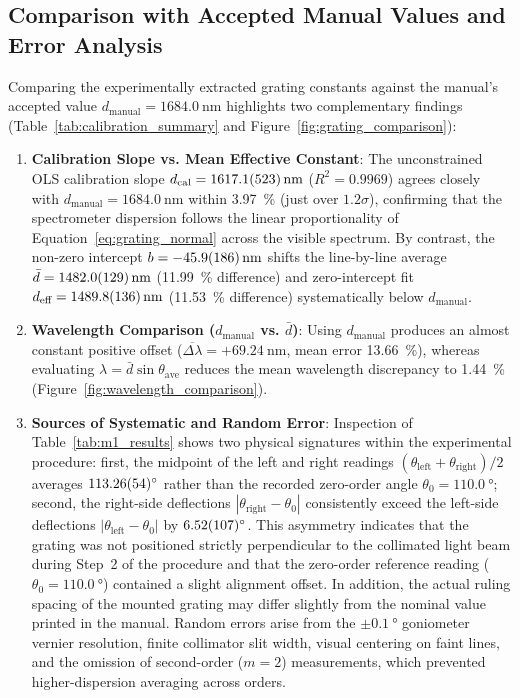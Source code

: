 \documentclass[journal]{IEEEtran}
\begin{document}
\subsection{Comparison with Accepted Manual Values and Error Analysis}
Comparing the experimentally extracted grating constants against the manual's accepted value $d_{\text{manual}} = \SI{1684.0}{\nano\meter}$ highlights two complementary findings (Table~\ref{tab:calibration_summary} and Figure~\ref{fig:grating_comparison}):
\begin{enumerate}
    \item \textbf{Calibration Slope vs. Mean Effective Constant}: The unconstrained OLS calibration slope $d_{\text{cal}} = \SI{1617.1 \pm 52.3}{\nano\meter}$ ($R^2 = 0.9969$) agrees closely with $d_{\text{manual}} = \SI{1684.0}{\nano\meter}$ within \SI{3.97}{\percent} (just over $1.2\sigma$), confirming that the spectrometer dispersion follows the linear proportionality of Equation~\eqref{eq:grating_normal} across the visible spectrum. By contrast, the non-zero intercept $b = \SI{-45.9 \pm 18.6}{\nano\meter}$ shifts the line-by-line average $\bar{d} = \SI{1482.0 \pm 12.9}{\nano\meter}$ (\SI{11.99}{\percent} difference) and zero-intercept fit $d_{\text{eff}} = \SI{1489.8 \pm 13.6}{\nano\meter}$ (\SI{11.53}{\percent} difference) systematically below $d_{\text{manual}}$.
    \item \textbf{Wavelength Comparison ($d_{\text{manual}}$ vs. $\bar{d}$)}: Using $d_{\text{manual}}$ produces an almost constant positive offset ($\overline{\Delta\lambda} = +\SI{69.24}{\nano\meter}$, mean error \SI{13.66}{\percent}), whereas evaluating $\lambda = \bar{d}\sin\theta_{\text{ave}}$ reduces the mean wavelength discrepancy to \SI{1.44}{\percent} (Figure~\ref{fig:wavelength_comparison}).
    \item \textbf{Sources of Systematic and Random Error}: Inspection of Table~\ref{tab:m1_results} shows two physical signatures within the experimental procedure: first, the midpoint of the left and right readings $(\theta_{\text{left}} + \theta_{\text{right}})/2$ averages $\SI{113.26 \pm 0.54}{\degree}$ rather than the recorded zero-order angle $\theta_0 = \SI{110.0}{\degree}$; second, the right-side deflections $|\theta_{\text{right}} - \theta_0|$ consistently exceed the left-side deflections $|\theta_{\text{left}} - \theta_0|$ by $\SI{6.52 \pm 1.07}{\degree}$. This asymmetry indicates that the grating was not positioned strictly perpendicular to the collimated light beam during Step~2 of the procedure and that the zero-order reference reading ($\theta_0 = \SI{110.0}{\degree}$) contained a slight alignment offset. In addition, the actual ruling spacing of the mounted grating may differ slightly from the nominal value printed in the manual. Random errors arise from the $\pm \SI{0.1}{\degree}$ goniometer vernier resolution, finite collimator slit width, visual centering on faint lines, and the omission of second-order ($m = 2$) measurements, which prevented higher-dispersion averaging across orders.
\end{enumerate}
\end{document}
